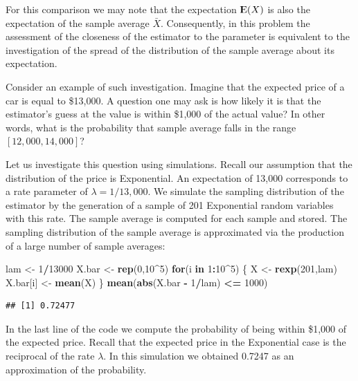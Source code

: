\documentclass[]{krantz}
\makeatletter
\newenvironment{Shaded}{\begin{snugshade}}{\end{snugshade}}
\newcommand{\KeywordTok}[1]{\textcolor[rgb]{0.13,0.29,0.53}{\textbf{#1}}}
\newcommand{\DecValTok}[1]{\textcolor[rgb]{0.00,0.00,0.81}{#1}}
\newcommand{\StringTok}[1]{\textcolor[rgb]{0.31,0.60,0.02}{#1}}
\newcommand{\ControlFlowTok}[1]{\textcolor[rgb]{0.13,0.29,0.53}{\textbf{#1}}}
\newcommand{\OperatorTok}[1]{\textcolor[rgb]{0.81,0.36,0.00}{\textbf{#1}}}
\newcommand{\NormalTok}[1]{#1}
\newcommand{\Expec}{{\rm I\kern-.3em E}}
\newenvironment{kframe}{%
\medskip{}
\setlength{\fboxsep}{.8em}
 \def\at@end@of@kframe{}%
 \ifinner\ifhmode%
  \def\at@end@of@kframe{\end{minipage}}%
  \begin{minipage}{\columnwidth}%
 \fi\fi%
 \def\FrameCommand##1{\hskip\@totalleftmargin \hskip-\fboxsep
 \colorbox{shadecolor}{##1}\hskip-\fboxsep
     \hskip-\linewidth \hskip-\@totalleftmargin \hskip\columnwidth}%
 \MakeFramed {\advance\hsize-\width
   \@totalleftmargin\z@ \linewidth\hsize
   \@setminipage}}%
 {\par\unskip\endMakeFramed%
 \at@end@of@kframe}
\renewenvironment{Shaded}{\begin{kframe}}{\end{kframe}}
\theoremstyle{definition}
\theoremstyle{definition}
\theoremstyle{definition}
\theoremstyle{remark}
\makeatother
\begin{document}
For this comparison we may note that the expectation \(\Expec(X)\) is
also the expectation of the sample average \(\bar X\). Consequently, in
this problem the assessment of the closeness of the estimator to the
parameter is equivalent to the investigation of the spread of the
distribution of the sample average about its expectation.

Consider an example of such investigation. Imagine that the expected
price of a car is equal to \$13,000. A question one may ask is how
likely it is that the estimator's guess at the value is within \$1,000
of the actual value? In other words, what is the probability that sample
average falls in the range \([12,000, 14,000]\)?

Let us investigate this question using simulations. Recall our
assumption that the distribution of the price is Exponential. An
expectation of 13,000 corresponds to a rate parameter of
\(\lambda = 1/13,000\). We simulate the sampling distribution of the
estimator by the generation of a sample of 201 Exponential random
variables with this rate. The sample average is computed for each sample
and stored. The sampling distribution of the sample average is
approximated via the production of a large number of sample averages:

\begin{Shaded}
\begin{Highlighting}[]
\NormalTok{lam <-}\StringTok{ }\DecValTok{1}\OperatorTok{/}\DecValTok{13000}
\NormalTok{X.bar <-}\StringTok{ }\KeywordTok{rep}\NormalTok{(}\DecValTok{0}\NormalTok{,}\DecValTok{10}\OperatorTok{^}\DecValTok{5}\NormalTok{)}
\ControlFlowTok{for}\NormalTok{(i }\ControlFlowTok{in} \DecValTok{1}\OperatorTok{:}\DecValTok{10}\OperatorTok{^}\DecValTok{5}\NormalTok{) \{}
\NormalTok{  X <-}\StringTok{ }\KeywordTok{rexp}\NormalTok{(}\DecValTok{201}\NormalTok{,lam)}
\NormalTok{  X.bar[i] <-}\StringTok{ }\KeywordTok{mean}\NormalTok{(X)}
\NormalTok{\}}
\KeywordTok{mean}\NormalTok{(}\KeywordTok{abs}\NormalTok{(X.bar }\OperatorTok{-}\StringTok{ }\DecValTok{1}\OperatorTok{/}\NormalTok{lam) }\OperatorTok{<=}\StringTok{ }\DecValTok{1000}\NormalTok{)}
\end{Highlighting}
\end{Shaded}

\begin{verbatim}
## [1] 0.72477
\end{verbatim}

In the last line of the code we compute the probability of being within
\$1,000 of the expected price. Recall that the expected price in the
Exponential case is the reciprocal of the rate \(\lambda\). In this
simulation we obtained 0.7247 as an approximation of the probability.
\end{document}
